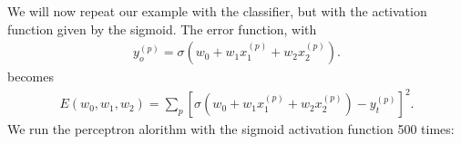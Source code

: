 \documentclass[letterpaper,10pt,english]{jupyterBook}
\begin{document}
\sphinxAtStartPar
We will now repeat our example with the classifier, but with the activation function given by the sigmoid. The error function, with
\begin{equation*}
\begin{split}y_o^{(p)}=\sigma(w_0+w_1 x_1^{(p)} +w_2 x_2^{(p)}). \end{split}
\end{equation*}
\sphinxAtStartPar
becomes
\begin{equation*}
\begin{split}E(w_0,w_1,w_2)=\sum_p \left [\sigma(w_0+w_1 x_1^{(p)} +w_2 x_2^{(p)})-y_t^{(p)} \right]^2.\end{split}
\end{equation*}
\sphinxAtStartPar
We run the perceptron alorithm with the sigmoid activation function 500 times:
\end{document}
